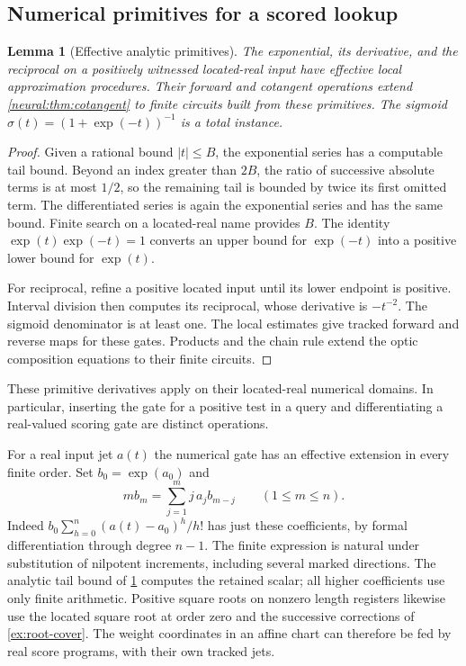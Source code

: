 \documentclass[11pt,a4paper]{article}
\newtheorem{lemma}[lemma]{Lemma}
\theoremstyle{definition}
\theoremstyle{remark}\newaliascnt{remark}{theorem}
\numberwithin{equation}{section}
\begin{document}
\subsection{Numerical primitives for a scored lookup}

\begin{lemma}[Effective analytic primitives]\label{neural:lem:analytic}
The exponential, its derivative, and the reciprocal on a positively witnessed located-real input have effective local approximation procedures. Their forward and cotangent operations extend \cref{neural:thm:cotangent} to finite circuits built from these primitives. The sigmoid $\sigma(t)=(1+\exp(-t))^{-1}$ is a total instance.
\end{lemma}
\begin{proof}
Given a rational bound $|t|\leq B$, the exponential series has a computable tail bound. Beyond an index greater than $2B$, the ratio of successive absolute terms is at most $1/2$, so the remaining tail is bounded by twice its first omitted term. The differentiated series is again the exponential series and has the same bound. Finite search on a located-real name provides $B$. The identity $\exp(t)\exp(-t)=1$ converts an upper bound for $\exp(-t)$ into a positive lower bound for $\exp(t)$.

For reciprocal, refine a positive located input until its lower endpoint is positive. Interval division then computes its reciprocal, whose derivative is $-t^{-2}$. The sigmoid denominator is at least one. The local estimates give tracked forward and reverse maps for these gates. Products and the chain rule extend the optic composition equations to their finite circuits.
\end{proof}
These primitive derivatives apply on their located-real numerical domains. In particular, inserting the gate for a positive test in a query and differentiating a real-valued scoring gate are distinct operations.

For a real input jet $a(t)$ the numerical gate has an effective extension in every finite order. Set $b_0=\exp(a_0)$ and
\[
           m b_m=\sum_{j=1}^m j\,a_j b_{m-j}\qquad(1\le m\le n).
\]
Indeed $b_0\sum_{h=0}^{n}(a(t)-a_0)^h/h!$ has just these coefficients, by formal differentiation through degree $n-1$. The finite expression is natural under substitution of nilpotent increments, including several marked directions. The analytic tail bound of \cref{neural:lem:analytic} computes the retained scalar; all higher coefficients use only finite arithmetic. Positive square roots on nonzero length registers likewise use the located square root at order zero and the successive corrections of \cref{ex:root-cover}. The weight coordinates in an affine chart can therefore be fed by real score programs, with their own tracked jets.
\end{document}
